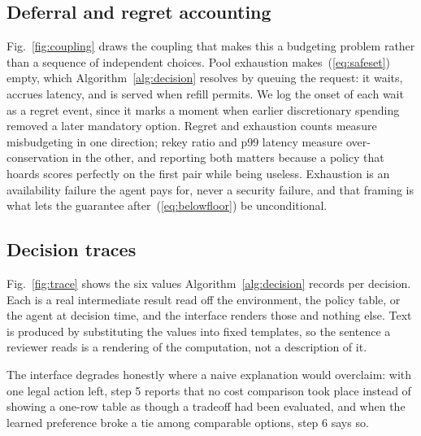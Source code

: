 \documentclass[conference]{IEEEtran}
\begin{document}
\subsection{Deferral and regret accounting}

Fig.~\ref{fig:coupling} draws the coupling that makes this a budgeting
problem rather than a sequence of independent choices. Pool
exhaustion makes~(\ref{eq:safeset}) empty, which Algorithm~\ref{alg:decision} resolves by
queuing the request: it waits, accrues latency, and is served
when refill permits. We log the onset of each wait as a regret
event, since it marks a moment when earlier discretionary
spending removed a later mandatory option. Regret and exhaustion counts measure misbudgeting in one direction; rekey
ratio and p99 latency measure over-conservation in the other,
and reporting both matters because a policy that hoards scores
perfectly on the first pair while being useless. Exhaustion is
an availability failure the agent pays for, never a security
failure, and that framing is what lets the guarantee after~(\ref{eq:belowfloor})
be unconditional.

\subsection{Decision traces}

Fig.~\ref{fig:trace} shows the six values Algorithm~\ref{alg:decision} records per decision. Each is a real intermediate result read off the environment, the policy table, or the agent at decision time, and the
interface renders those and nothing else. Text is produced by
substituting the values into fixed templates, so the sentence
a reviewer reads is a rendering of the computation, not a
description of it.

The interface degrades honestly where a naive explanation
would overclaim: with one legal action left, step 5 reports
that no cost comparison took place instead of showing a one-row table as though a tradeoff had been evaluated, and when
the learned preference broke a tie among comparable options,
step 6 says so.
\end{document}
